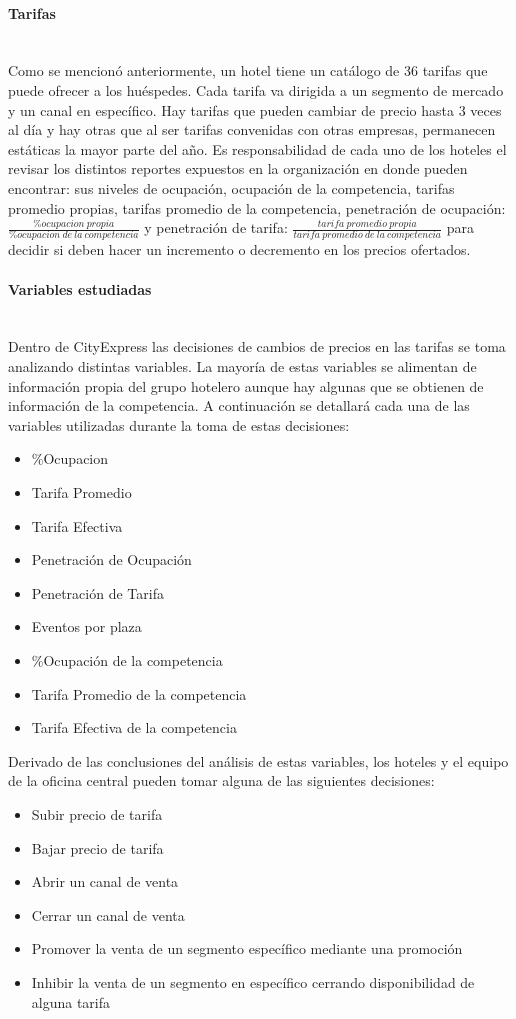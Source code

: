 \documentclass[a4paper,11pt]{article}
\begin{document}
\paragraph{Tarifas} ~\\
Como se mencionó anteriormente, un hotel tiene un catálogo de 36 tarifas que puede ofrecer a los huéspedes. Cada tarifa va dirigida a un segmento de mercado y un canal en específico. Hay tarifas que pueden cambiar de precio hasta 3 veces al día y hay otras que al ser tarifas convenidas con otras empresas, permanecen estáticas la mayor parte del año.
Es responsabilidad de cada uno de los hoteles el revisar los distintos reportes expuestos en la organización en donde pueden encontrar: sus niveles de ocupación, ocupación de la competencia, tarifas promedio propias, tarifas promedio de la competencia, penetración de ocupación: $\frac{\% ocupacion\ propia}{ \% ocupacion\ de\ la\ competencia}$ y penetración de tarifa: $\frac{tarifa\ promedio\ propia}{tarifa\ promedio\ de\ la\ competencia}$ para decidir si deben hacer un incremento o decremento en los precios ofertados.
\paragraph{Variables estudiadas} ~\\
Dentro de CityExpress las decisiones de cambios de precios en las tarifas se toma analizando distintas variables. La mayoría de estas variables se alimentan de información propia del grupo hotelero aunque hay algunas que se obtienen de información de la competencia. A continuación se detallará cada una de las variables utilizadas durante la toma de estas decisiones:
\begin{itemize}[noitemsep]
\item \%Ocupacion
\item Tarifa Promedio
\item Tarifa Efectiva
\item Penetración de Ocupación
\item Penetración de Tarifa
\item Eventos por plaza
\item \%Ocupación de la competencia
\item Tarifa Promedio de la competencia
\item Tarifa Efectiva de la competencia
\end{itemize}
Derivado de las conclusiones del análisis de estas variables, los hoteles y el equipo de la oficina central pueden tomar alguna de las siguientes decisiones:
\begin{itemize}[noitemsep]
\item Subir precio de tarifa
\item Bajar precio de tarifa
\item Abrir un canal de venta
\item Cerrar un canal de venta
\item Promover la venta de un segmento específico mediante una promoción
\item Inhibir la venta de un segmento en específico cerrando disponibilidad de alguna tarifa
\end{itemize}
\end{document}
